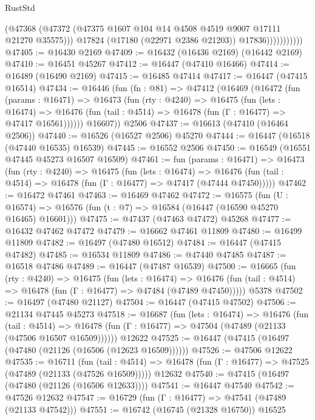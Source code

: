 \begin{lexlean}{RustStd}
\begin{coremodule}
                          (@47368
                            (@47372 (@47375 @1607 @104 @14 @4508 @4519 @9007 @17111 @21270 @35575)))
                          @17824
                          (@17180 (@22971 @2386 @21203))
                          @17836)))))))))))
@47405 := @16430 @2169
@47409 := @16432 (@16436 @2169) (@16442 @2169)
@47410 := @16451 @45267
@47412 := @16447 (@47410 @16466)
@47414 := @16489 (@16490 @2169)
@47415 := @16485 @47414
@47417 := @16447 (@47415 @16514)
@47434 := @16446
    (fun (fn : @81) =>
    @47412
      (@16469
        (@16472
          (fun (params : @16471) =>
          @16473
            (fun (rty : @4240) =>
            @16475
              (fun (lets : @16474) =>
              @16476 (fun (tail : @4514) => @16478 (fun (Γ : @16477) => @47417 @16561))))))
        @16607))
    @2506
@47437 := @16613 (@47410 (@16464 @2506))
@47440 := @16526 (@16527 @2506) @45270
@47444 := @16447 (@16518 (@47440 @16535) @16539)
@47445 := @16552 @2506
@47450 := @16549 (@16551 @47445 @45273 @16507 @16509)
@47461 := fun (params : @16471) =>
  @16473
    (fun (rty : @4240) =>
    @16475
      (fun (lets : @16474) =>
      @16476 (fun (tail : @4514) => @16478 (fun (Γ : @16477) => @47417 (@47444 @47450)))))
@47462 := @16472 @47461
@47463 := @16469 @47462
@47472 := @16575
    (fun (U : @16574) => @16576 (fun (t : @7) => @16584 (@16447 (@16590 @45270 @16465) @16601)))
@47475 := @47437 (@47463 @47472) @45268
@47477 := @16432 @47462 @47472
@47479 := @16662 @47461 @11809
@47480 := @16499 @11809
@47482 := @16497 (@47480 @16512)
@47484 := @16447 (@47415 @47482)
@47485 := @16534 @11809
@47486 := @47440 @47485
@47487 := @16518 @47486
@47489 := @16447 (@47487 @16539)
@47500 := @16665
    (fun (rty : @4240) =>
    @16475
      (fun (lets : @16474) =>
      @16476 (fun (tail : @4514) => @16478 (fun (Γ : @16477) => @47484 (@47489 @47450)))))
    @5378
@47502 := @16497 (@47480 @21127)
@47504 := @16447 (@47415 @47502)
@47506 := @21134 @47445 @45273
@47518 := @16687
    (fun (lets : @16474) =>
    @16476
      (fun (tail : @4514) =>
      @16478 (fun (Γ : @16477) => @47504 (@47489 (@21133 (@47506 @16507 @16509))))))
    @12622
@47525 := @16447 (@47415 (@16497 (@47480 (@21126 (@16506 (@12623 @16509))))))
@47526 := @47506 @12622
@47535 := @16711
    (fun (tail : @4514) => @16478 (fun (Γ : @16477) => @47525 (@47489 (@21133 (@47526 @16509)))))
    @12632
@47540 := @47415 (@16497 (@47480 (@21126 (@16506 @12633))))
@47541 := @16447 @47540
@47542 := @47526 @12632
@47547 := @16729 (fun (Γ : @16477) => @47541 (@47489 (@21133 @47542)))
@47551 := @16742 (@16745 (@21328 @16750)) @16525

\end{coremodule}
\end{lexlean}
